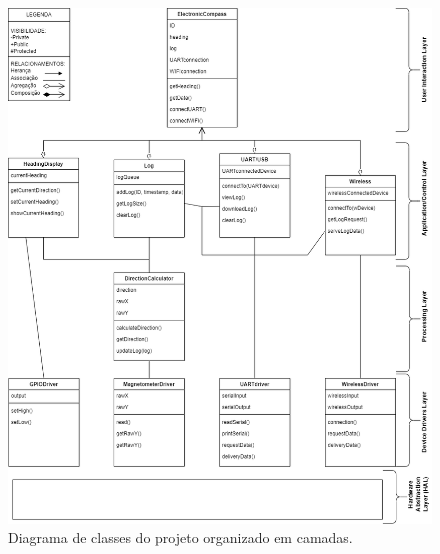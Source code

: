 \documentclass[10pt,twocolumn,letterpaper]{article}
\begin{document}

\onecolumn
{}
\label{apendice-a}
\begin{figure}[h]
  \centering
  \includegraphics[keepaspectratio=true,scale=0.44]{figures/Diagrama_Classe_Projeto_Final.png}
  \caption{Diagrama de classes do projeto organizado em camadas.}
  \label{fig:diagrama-classes}
\end{figure}

\onecolumn
{}
\label{apendice-b}
\end{document}
